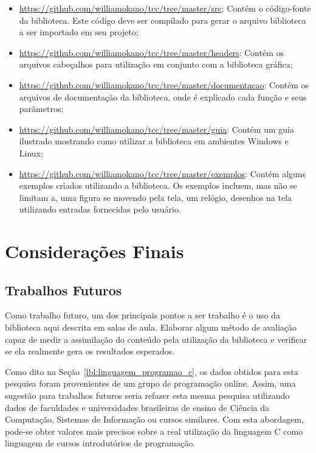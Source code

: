 \documentclass[12pt, %
openright,
oneside, %
a4paper,    %
brazil]{facom-ufu-abntex2}
\begin{document}
\begin{itemize}
    \item \url{https://github.com/williamokano/tcc/tree/master/src}: Contém o código-fonte da biblioteca. Este código deve ser compilado para gerar o arquivo biblioteca a ser importado em seu projeto;
    \item \url{https://github.com/williamokano/tcc/tree/master/headers}: Contém os arquivos cabeçalhos para utilização em conjunto com a biblioteca gráfica;
    \item \url{https://github.com/williamokano/tcc/tree/master/documentacao}: Contém os arquivos de documentação da biblioteca, onde é explicado cada função e seus parâmetros;
    \item \url{https://github.com/williamokano/tcc/tree/master/guia}: Contém um guia ilustrado mostrando como utilizar a biblioteca em ambientes Windows e Linux;
    \item \url{https://github.com/williamokano/tcc/tree/master/exemplos}: Contém alguns exemplos criados utilizando a biblioteca. Os exemplos incluem, mas não se limitam a, uma figura se movendo pela tela, um relógio, desenhos na tela utilizando entradas fornecidas pelo usuário.
\end{itemize}

\chapter{Considerações Finais}

\section{Trabalhos Futuros}
Como trabalho futuro, um dos principais pontos a ser trabalho é o uso da biblioteca aqui descrita em salas de aula. Elaborar algum método de avaliação capaz de medir a assimilação do conteúdo pela utilização da biblioteca e verificar se ela realmente gera os resultados esperados.

Como dito na Seção~\ref{lbl:linguagem_programao_c}, os dados obtidos para esta pesquisa foram provenientes de um grupo de programação online. Assim, uma sugestão para trabalhos futuros seria refazer esta mesma pesquisa utilizando dados de faculdades e universidades brasileiras de ensino de Ciência da Computação, Sistemas de Informação ou cursos similares. Com esta abordagem, pode-se obter valores mais precisos sobre a real utilização da linguagem C como linguagem de cursos introdutórios de programação.
\end{document}
